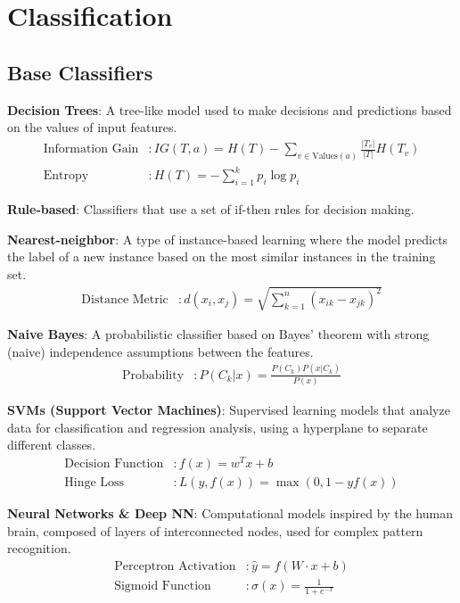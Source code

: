 \documentclass{article}
\begin{document}
\section{Classification}

\subsection{Base Classifiers}
\textbf{Decision Trees}: A tree-like model used to make decisions and predictions based on the values of input features.
\begin{align*}
    \text{Information Gain} &: IG(T, a) = H(T) - \sum_{v \in \text{Values}(a)} \frac{|T_v|}{|T|} H(T_v) \\
    \text{Entropy} &: H(T) = -\sum_{i=1}^{k} p_i \log p_i
\end{align*}

\textbf{Rule-based}: Classifiers that use a set of if-then rules for decision making.

\textbf{Nearest-neighbor}: A type of instance-based learning where the model predicts the label of a new instance based on the most similar instances in the training set.
\begin{align*}
    \text{Distance Metric} &: d(x_i, x_j) = \sqrt{\sum_{k=1}^{n} (x_{ik} - x_{jk})^2}
\end{align*}

\textbf{Naive Bayes}: A probabilistic classifier based on Bayes' theorem with strong (naive) independence assumptions between the features.
\begin{align*}
    \text{Probability} &: P(C_k | x) = \frac{P(C_k) P(x | C_k)}{P(x)}
\end{align*}

\textbf{SVMs (Support Vector Machines)}: Supervised learning models that analyze data for classification and regression analysis, using a hyperplane to separate different classes.
\begin{align*}
    \text{Decision Function} &: f(x) = w^T x + b \\
    \text{Hinge Loss} &: L(y, f(x)) = \max(0, 1 - y f(x))
\end{align*}

\textbf{Neural Networks \& Deep NN}: Computational models inspired by the human brain, composed of layers of interconnected nodes, used for complex pattern recognition.
\begin{align*}
    \text{Perceptron Activation} &: \hat{y} = f(W \cdot x + b) \\
    \text{Sigmoid Function} &: \sigma(x) = \frac{1}{1 + e^{-x}}
\end{align*}
\end{document}
